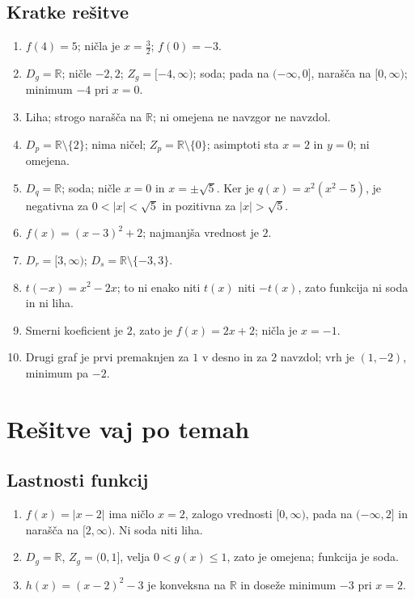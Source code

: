 \documentclass[a4paper,12pt]{article}
\begin{document}
\clearpage
\subsection{Kratke rešitve}
\begin{enumerate}
	\item $f(4)=5$; ničla je $x=\frac32$; $f(0)=-3$.
	\item $D_g=\mathbb{R}$; ničle $-2,2$; $Z_g=[-4,\infty)$; soda; pada na $(-\infty,0]$, narašča na $[0,\infty)$; minimum $-4$ pri $x=0$.
	\item Liha; strogo narašča na $\mathbb{R}$; ni omejena ne navzgor ne navzdol.
	\item $D_p=\mathbb{R}\setminus\{2\}$; nima ničel; $Z_p=\mathbb{R}\setminus\{0\}$; asimptoti sta $x=2$ in $y=0$; ni omejena.
	\item $D_q=\mathbb{R}$; soda; ničle $x=0$ in $x=\pm\sqrt5$. Ker je $q(x)=x^2(x^2-5)$, je negativna za $0<|x|<\sqrt5$ in pozitivna za $|x|>\sqrt5$.
	\item $f(x)=(x-3)^2+2$; najmanjša vrednost je $2$.
	\item $D_r=[3,\infty)$; $D_s=\mathbb{R}\setminus\{-3,3\}$.
	\item $t(-x)=x^2-2x$; to ni enako niti $t(x)$ niti $-t(x)$, zato funkcija ni soda in ni liha.
	\item Smerni koeficient je $2$, zato je $f(x)=2x+2$; ničla je $x=-1$.
	\item Drugi graf je prvi premaknjen za $1$ v desno in za $2$ navzdol; vrh je $(1,-2)$, minimum pa $-2$.
\end{enumerate}

	\clearpage
	\section*{Rešitve vaj po temah}

	\subsection*{Lastnosti funkcij}
	\begin{enumerate}
		\item $f(x)=|x-2|$ ima ničlo $x=2$, zalogo vrednosti $[0,\infty)$, pada na $(-\infty,2]$ in narašča na $[2,\infty)$. Ni soda niti liha.
		\item $D_g=\mathbb{R}$, $Z_g=(0,1]$, velja $0<g(x)\leq1$, zato je omejena; funkcija je soda.
		\item $h(x)=(x-2)^2-3$ je konveksna na $\mathbb{R}$ in doseže minimum $-3$ pri $x=2$.
	\end{enumerate}
\end{document}
